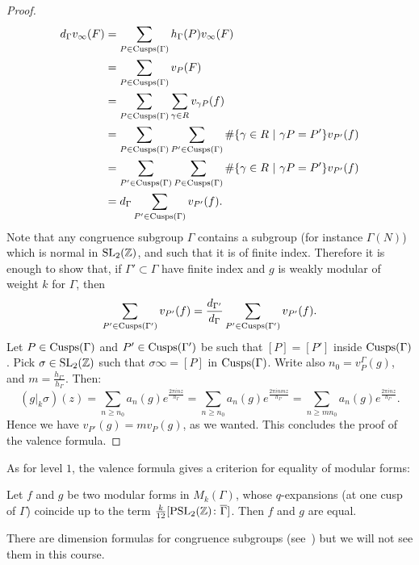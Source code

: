 \begin{proof}
\begin{align*}
d_\Gamma v_\infty(F) &= \sum_{P\in\operatorname{Cusps}(\Gamma)} h_\Gamma(P)v_\infty(F)\\
&=\sum_{P\in\operatorname{Cusps}(\Gamma)} v_P(F)\\
&=\sum_{P\in\operatorname{Cusps}(\Gamma)} \sum_{\gamma\in R} v_{\gamma P}(f)\\
&=\sum_{P\in\operatorname{Cusps}(\Gamma)} \sum_{P'\in\operatorname{Cusps}(\Gamma)} \#\{\gamma\in R ~|~ \gamma P = P'\} v_{P'}(f)\\
&=\sum_{P'\in\operatorname{Cusps}(\Gamma)} \sum_{P\in\operatorname{Cusps}(\Gamma)} \#\{\gamma\in R ~|~ \gamma P = P'\} v_{P'}(f)\\
&=d_\Gamma\sum_{P'\in\operatorname{Cusps}(\Gamma)} v_{P'}(f).
\end{align*}
Note that any congruence subgroup $\Gamma$ contains a subgroup (for instance $\Gamma(N)$) which is normal in $\operatorname{SL}_2(\mathbb{Z})$, and such that it is of finite index. Therefore it is enough to show that, if $\Gamma'\subset \Gamma$ have finite index and $g$ is weakly modular of weight $k$ for $\Gamma$, then
\[
\sum_{P'\in \operatorname{Cusps}(\Gamma')} v_{P'}(f) = \frac{d_{\Gamma'}}{d_\Gamma} \sum_{P'\in \operatorname{Cusps}(\Gamma')} v_{P'}(f).
\]
Let $P\in\operatorname{Cusps}(\Gamma)$ and $P'\in\operatorname{Cusps}(\Gamma')$ be such that $[P]=[P']$ inside $\operatorname{Cusps}(\Gamma)$. Pick $\sigma\in\operatorname{SL}_2(\mathbb{Z})$ such that $\sigma\infty = [P]$ in $\operatorname{Cusps}(\Gamma)$. Write also $n_0 = v_P^\Gamma(g)$, and $m = \frac{h_{\Gamma'}}{h_\Gamma}$. Then:
\[
(g|_k\sigma)(z) = \sum_{n\geq n_0} a_n(g) e^{\frac{2\pi i n z}{h_\Gamma}} = \sum_{n\geq n_0} a_n(g)e^{\frac{2\pi i nmz}{h_{\Gamma'}}} = \sum_{n\geq mn_0} a_n(g)e^{\frac{2\pi i nz}{h_{\Gamma'}}}.
\]
Hence we have $v_{P'}(g) = m v_P(g)$, as we wanted. This concludes the proof of the valence formula.
\end{proof}

As for level $1$, the valence formula gives a criterion for equality of modular forms:
\begin{corollary}
  Let $f$ and $g$ be two modular forms in $M_k(\Gamma)$, whose $q$-expansions (at one cusp of $\Gamma$) coincide up to the term $\frac{k}{12}[\operatorname{PSL}_2(\mathbb{Z})\colon\overline{\Gamma}]$. Then $f$ and $g$ are equal.
\end{corollary}

There are dimension formulas for congruence subgroups (see~\cite[Chapter 3]{diamond-shurman}) but we will not see them in this course.


